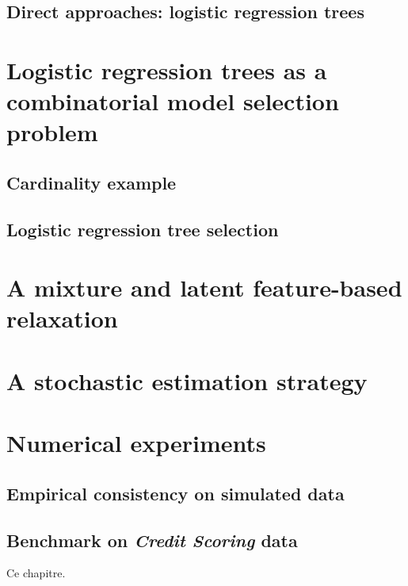 \subsection{Direct approaches: logistic regression trees}



\section{Logistic regression trees as a combinatorial model selection problem}


\subsection{Cardinality example}


\subsection{Logistic regression tree selection}



\section{A mixture and latent feature-based relaxation}




\section{A stochastic estimation strategy}


\section{Numerical experiments}


\subsection{Empirical consistency on simulated data}

\subsection{Benchmark on \textit{Credit Scoring} data}




\bigskip

Ce chapitre.


\printbibliography[heading=subbibliography, title=References of Chapter 5]

